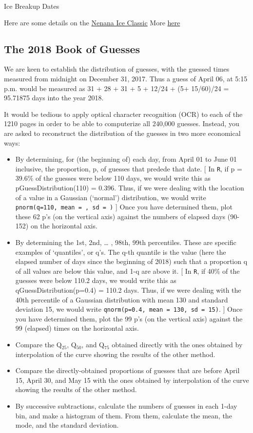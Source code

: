 \documentclass[]{book}
\begin{document}
Ice Breakup Dates

Here are some details on the
\href{http://www.nenanaakiceclassic.com}{Nenana Ice Classic}
More \href{http://www.john-daly.com/nenana.htm}{here}

\hypertarget{the-2018-book-of-guesses}{%
\subsection{The 2018 Book of Guesses}\label{the-2018-book-of-guesses}}

We are keen to establish the distribution of guesses, with the guessed times measured from midnight on December 31, 2017. Thus a guess of April 06, at 5:15 p.m. would be measured as 31 + 28 + 31 + 5 + 12/24 + (5+ 15/60)/24 = 95.71875 days into the year 2018.

It would be tedious to apply optical character recognition (OCR) to each of the 1210 pages in order to be able to computerize all 240,000 guesses. Instead, you are asked to reconstruct the distribution of the guesses in two more economical ways:

\begin{itemize}
\item
  By determining, for (the beginning of) each day, from April 01 to June 01 inclusive, the proportion, p, of guesses that predede that date. {[} In \texttt{R}, if p = 39.6\% of the guesses were below 110 days, we would write this as pGuessDistribution(110) = 0.396. Thus, if we were dealing with the location of a value in a Gaussian (`normal') distribution, we would write \texttt{pnorm(q=110,\ mean\ =\ ,\ sd\ =\ )} {]} Once you have determined them, plot these 62 p's (on the vertical axis) against the numbers of elapsed days (90-152) on the horizontal axis.
\item
  By determining the 1st, 2nd, \ldots{} , 98th, 99th percentiles. These are specific examples of `quantiles', or q's. The q-th quantile is the value (here the elapsed number of days since the beginning of 2018) such that a proportion q of all values are below this value, and 1-q are above it. {[} In \texttt{R}, if 40\% of the guesses were below 110.2 days, we would write this as qGuessDistribution(p=0.4) = 110.2 days. Thus, if we were dealing with the 40th percentile of a Gaussian distribution with mean 130 and standard deviation 15, we would write \texttt{qnorm(p=0.4,\ mean\ =\ 130,\ sd\ =\ 15)}. {]} Once you have determined them, plot the 99 p's (on the vertical axis) against the 99 (elapsed) times on the horizontal axis.
\item
  Compare the Q\(_{25}\), Q\(_{50}\), and Q\(_{75}\) obtained directly with the ones obtained by interpolation of the curve showing the results of the other method.
\item
  Compare the directly-obtained proportions of guesses that are before April 15, April 30, and May 15 with the ones obtained by interpolation of the curve showing the results of the other method.
\item
  By successive subtractions, calculate the numbers of guesses in each 1-day bin, and make a histogram of them. From them, calculate the mean, the mode, and the standard deviation.
\end{itemize}
\end{document}
